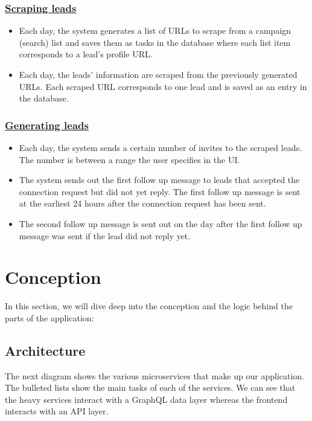 \subsubsection*{\underline{Scraping leads}}
\begin{itemize}
	\item Each day, the system generates a list of URLs to scrape from a campaign (search) list and saves them as tasks in the database where each list item corresponds to a lead's profile URL.
	\item Each day, the leads' information are scraped from the previously generated URLs. Each scraped URL corresponds to one lead and is saved as an entry in the database.
\end{itemize}

\subsubsection*{\underline{Generating leads}}
\begin{itemize}
	\item Each day, the system sends a certain number of invites to the scraped leads. The number is between a range the user specifies in the UI.
	\item The system sends out the first follow up message to leads that accepted the connection request but did not yet reply. The first follow up message is sent at the earliest 24 hours after the connection request has been sent.
	\item The second follow up message is sent out on the day after the first follow up message was sent if the lead did not reply yet.
\end{itemize}

\newpage

\section{Conception}
In this section, we will dive deep into the conception and the logic behind the parts of the application:

\subsection{Architecture}
The next diagram shows the various microservices that make up our application.
The bulleted lists show the main tasks of each of the services.
We can see that the heavy services interact with a GraphQL data layer whereas the frontend interacts with an API layer.

